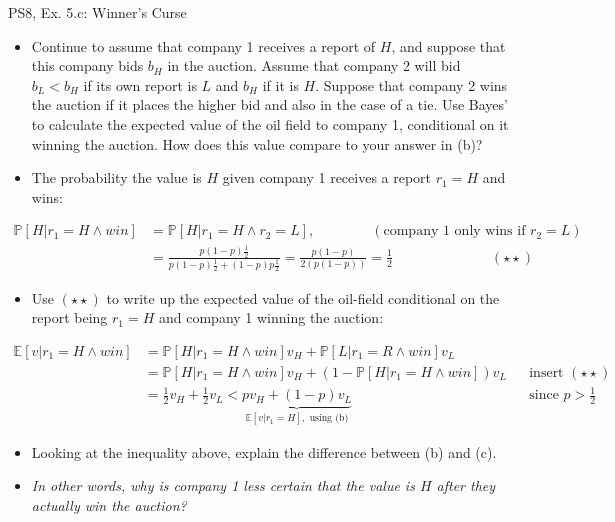\begin{frame}{PS8, Ex. 5.c: Winner's Curse}
      \begin{itemize}
        \item[(c)] Continue to assume that company 1 receives a report of $H$, and suppose that this company bids $b_H$ in the auction. Assume that company 2 will bid $b_L < b_H$ if its own report is $L$ and $b_H$ if it is $H$. Suppose that company 2 wins the auction if it places the higher bid and also in the case of a tie. Use Bayes’ to calculate the expected value of the oil field to company 1, conditional on it winning the auction. How does this value compare to your answer in (b)?
        \item[Step 1:] The probability the value is $H$ given company 1 receives a report $r_1=H$ and wins:
        \end{itemize}
        \vspace{-8pt}
        \begin{align*}
          \mathbb{P}[H|r_1=H\wedge win]&=\mathbb{P}[H|r_1=H\wedge r_2=L],\quad\quad\quad\quad(\text{company 1 only wins if }r_2=L)\\
            &=\frac{p(1-p)\frac{1}{2}}{p(1-p)\frac{1}{2}+(1-p)p\frac{1}{2}}=\frac{p(1-p)}{2(p(1-p))}=\frac{1}{2}\quad\quad\quad\quad\quad\quad\quad(\star\star)
        \end{align*}
        \vspace{-8pt}
        \begin{itemize}
        \item[Step 2:] Use $(\star\star)$ to write up the expected value of the oil-field conditional on the report being $r_1=H$ and company 1 winning the auction:
      \end{itemize}
      \vspace{-4pt}
      \begin{align*}
        \mathbb{E}[v|r_1=H\wedge win]&=\mathbb{P}[H|r_1=H\wedge win]v_H+\mathbb{P}[L|r_1=R\wedge win]v_L\\
        &=\mathbb{P}[H|r_1=H\wedge win]v_H+\left(1-\mathbb{P}[H|r_1=H\wedge win]\right)v_L&&\text{insert }(\star\star)\\
        &=\frac{1}{2}v_H+\frac{1}{2}v_L<\underbrace{pv_H+(1-p)v_L}_{\textstyle\mathbb{E}[v|r_1=H],\text{ using (b)}}&&\text{since }p>\frac{1}{2}
      \end{align*}
      \vspace{-10pt}
      \begin{itemize}
        \item[Step 3:] Looking at the inequality above, explain the difference between (b) and (c).
        \item[]        \textit{In other words, why is company 1 less certain that the value is $H$ after they actually win the auction?}
      \end{itemize}
      \vfill\null
\end{frame}
